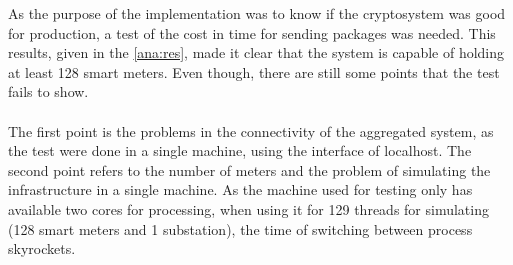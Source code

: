 
   As the purpose of the implementation was to know if the cryptosystem was
   good for production, a test of the cost in time for sending packages was
   needed. This results, given in the \ref{ana:res}, made it clear that
   the system is capable of holding at least 128 smart meters. Even though,
   there are still some points that the test fails to show.\\
   \\
   The first point is the problems in the connectivity of the aggregated system, as the test were done in a single machine, using the interface of localhost.
   The second point refers to the number of meters and the problem of simulating the infrastructure in a single machine. As the machine used for testing only has available two cores for processing, when using it for 129 threads for simulating (128 smart meters and 1 substation), the time of switching between process skyrockets.
   


